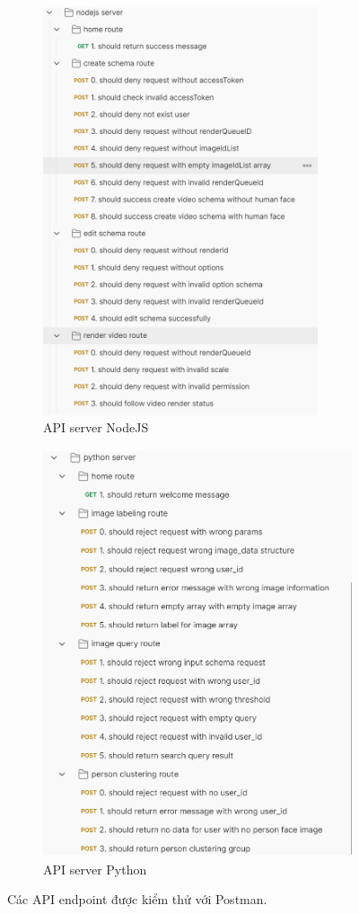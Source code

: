 \begin{figure}[H]
    \centering
    \begin{subfigure}{0.48\textwidth}
        \centering
        \includegraphics[height=12cm]{figures/c4/4-3/api_node.png} 
        \caption{API server NodeJS}
    \end{subfigure}
    \hfill
    \begin{subfigure}{0.48\textwidth}
        \centering
        \includegraphics[height=12cm]{figures/c4/4-3/api_python.png} 
        \caption{API server Python}
    \end{subfigure}
    \caption{Các API endpoint được kiểm thử với Postman.}
    \label{fig:postman}
\end{figure}

